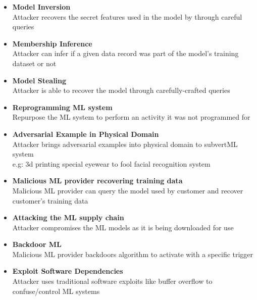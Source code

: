 {\begin{itemize}
\begin{itemize}
{            In the Tay chatbot, future conversations were tainted because a fraction of the past conversations were used to
            train the system via feedback.
            }
      \end{itemize}
      \item \textbf{Model Inversion}\\
      Attacker recovers the secret features used in the model by through careful queries
      \item \textbf{Membership Inference}\\
      Attacker can infer if a given data record was part of the model’s training dataset or not
      \item \textbf{Model Stealing}\\
      Attacker is able to recover the model through carefully-crafted queries
      \item \textbf{Reprogramming ML system}\\
      Repurpose the ML system to perform an activity it was not programmed for
      \item \textbf{Adversarial Example in Physical Domain}\\
      Attacker brings adversarial examples into
      physical domain to subvertML system\\
      e.g: 3d printing special eyewear to fool facial recognition system
      \item \textbf{Malicious ML provider recovering training data}\\
      Malicious ML provider can query the model used by
      customer and recover customer’s training data
      \item \textbf{Attacking the ML supply chain}\\
      Attacker compromises the ML models as it is being downloaded for use
      \item \textbf{Backdoor ML}\\
      Malicious ML provider backdoors algorithm to activate with a specific trigger
      \item \textbf{Exploit Software Dependencies}\\
      Attacker uses traditional software exploits like buffer overflow to confuse/control ML systems
   \end{itemize}
}
